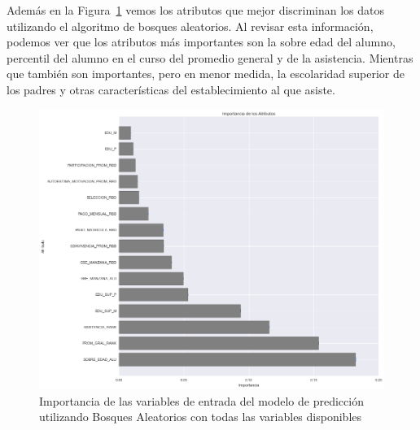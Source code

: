 Además en la Figura~\ref{fig:impo-total} vemos los atributos que mejor discriminan los datos utilizando el algoritmo de bosques aleatorios. Al revisar esta información, podemos ver que los atributos más importantes son la sobre edad del alumno, percentil del alumno en el curso del promedio general y de la asistencia. Mientras que también son importantes, pero en menor medida, la escolaridad superior de los padres y otras características del establecimiento al que asiste.

\begin{figure}[H]
  \centering
    \includegraphics[trim=0cm 0cm 0cm 0cm,scale=0.4]{Figuras/7AnalisisResultado/impo-total.png}
      \caption{Importancia de las variables de entrada del modelo de predicción utilizando Bosques Aleatorios con todas las variables disponibles}
    \label{fig:impo-total}
\end{figure}

